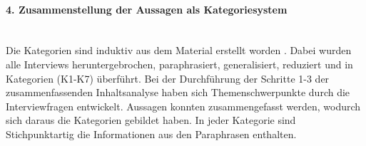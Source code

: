 \paragraph{4. Zusammenstellung der Aussagen als Kategoriesystem}\label{sec:kategorien}\mbox{} \\
Die Kategorien sind induktiv aus dem Material erstellt worden \cite{mayring2012qualitative}. Dabei wurden alle Interviews heruntergebrochen, paraphrasiert, generalisiert, reduziert und in Kategorien (K1-K7) überführt. Bei der Durchführung der Schritte 1-3 der zusammenfassenden Inhaltsanalyse haben sich Themenschwerpunkte durch die Interviewfragen entwickelt. Aussagen konnten zusammengefasst werden, wodurch sich daraus die Kategorien gebildet haben. In jeder Kategorie sind Stichpunktartig die Informationen aus den Paraphrasen enthalten. \\
